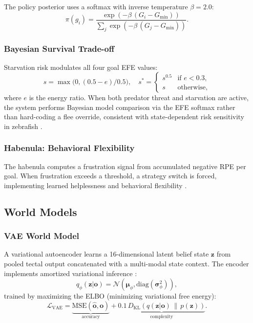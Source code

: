 \documentclass[12pt]{article}
\begin{document}
The policy posterior uses a softmax with inverse temperature
$\beta = 2.0$:
\begin{equation}\label{eq:posterior}
  \pi(g_i) = \frac{\exp(-\beta\,(G_i - G_\text{min}))}
                   {\sum_j \exp(-\beta\,(G_j - G_\text{min}))}.
\end{equation}

\subsubsection{Bayesian Survival Trade-off}

Starvation risk modulates all four goal EFE values:
\begin{equation}\label{eq:starvation}
  s = \max\!\bigl(0, (0.5 - e)/0.5\bigr),
  \quad s^* = \begin{cases} s^{0.5} & \text{if } e < 0.3, \\ s & \text{otherwise}, \end{cases}
\end{equation}
where $e$ is the energy ratio.
When both predator threat and starvation are active, the system
performs Bayesian model comparison via the EFE softmax rather than
hard-coding a flee override, consistent with state-dependent risk
sensitivity in zebrafish \citep{lima1990}.

\subsubsection{Habenula: Behavioral Flexibility}

The habenula computes a frustration signal from accumulated negative
RPE per goal.
When frustration exceeds a threshold, a strategy switch is forced,
implementing learned helplessness and behavioral flexibility
\citep{amo2014}.

\subsection{World Models}\label{sec:world_models}

\subsubsection{VAE World Model}

A variational autoencoder learns a 16-dimensional latent belief state
$\mathbf{z}$ from pooled tectal output concatenated with a
multi-modal state context.
The encoder implements amortized variational inference
\citep{kingma2014}:
\begin{equation}\label{eq:vae}
  q_\phi(\mathbf{z}|\mathbf{o}) = \mathcal{N}(\boldsymbol{\mu}_\phi,
    \text{diag}(\boldsymbol{\sigma}_\phi^2)),
\end{equation}
trained by maximizing the ELBO (minimizing variational free energy):
\begin{equation}\label{eq:elbo}
  \mathcal{L}_\text{VAE} =
    \underbrace{\text{MSE}(\hat{\mathbf{o}}, \mathbf{o})}_{\text{accuracy}}
    + \underbrace{0.1\,D_\text{KL}(q(\mathbf{z}|\mathbf{o})\,\|\,p(\mathbf{z}))}_{\text{complexity}}.
\end{equation}
\end{document}
